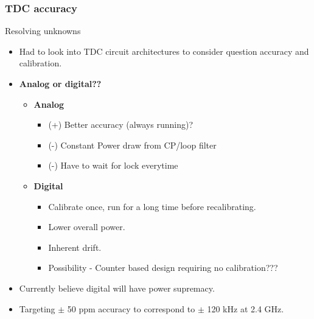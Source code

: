\documentclass[t, screen, aspectratio=43]{beamer}
\begin{document}
\begin{frame}
	\frametitle{TDC accuracy}
	\begin{block}{Resolving unknowns}
		\begin{itemize}
			\scriptsize
			\item Had to look into TDC circuit architectures to consider question accuracy and calibration.
			\item \textbf{Analog or digital??}
			\begin{itemize}
				\scriptsize
				\item \textbf{Analog}
				\begin{itemize}
					\scriptsize
					\item (+) Better accuracy (always running)?
					\item (-) Constant Power draw from CP/loop filter
					\item (-) Have to wait for lock everytime
				\end{itemize}

				\item \textbf{Digital}
				\begin{itemize}
					\scriptsize
					\item Calibrate once, run for a long time before recalibrating.
					\item Lower overall power.
					\item Inherent drift.
					\item Possibility - Counter based design requiring no calibration???
				\end{itemize}
			\end{itemize}
			\item Currently believe digital will have power supremacy.
			\item Targeting $\pm$ 50 ppm accuracy to correspond to $\pm$ 120 kHz at 2.4 GHz.
		\end{itemize} 	
	\end{block}
\end{frame}
\end{document}
